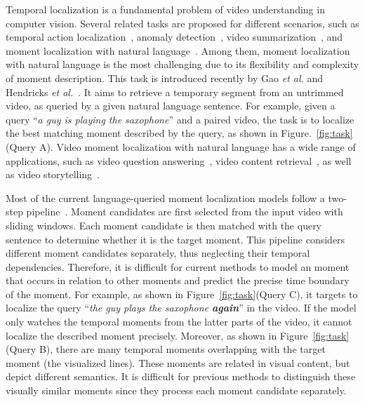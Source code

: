 \documentclass[letterpaper]{article} %
\begin{document}
Temporal localization is a fundamental problem of video understanding in computer vision.
Several related tasks are proposed for different scenarios, such as temporal action localization~\cite{SSN2017ICCV}, anomaly detection~\cite{hasan2016learning}, video summarization~\cite{song2015tvsum,chu2015video}, and moment localization with natural language~\cite{gao2017tall,hendricks17iccv}.
Among them, moment localization with natural language is the most challenging due to its flexibility and complexity of moment description.
This task is introduced recently by Gao \textit{et al.} and Hendricks \textit{et al.}~\cite{hendricks17iccv,gao2017tall}.
It aims to retrieve a temporary segment from an untrimmed video, as queried by a given natural language sentence.
For example, given a query ``\textit{a guy is playing the saxophone}'' and a paired video, the task is to localize the best matching moment described by the query, as shown in Figure.~\ref{fig:task}(Query A). Video moment localization with natural language has a wide range of applications, such as video question answering~\cite{lei2018tvqa}, video content retrieval~\cite{Shao_2018_ECCV}, as well as video storytelling~\cite{gella2018dataset}.


Most of the current language-queried moment localization models follow a two-step pipeline~\cite{gao2017tall,hendricks17iccv,Ge_2019_WACV,liu2018attentive,song2018val}.
Moment candidates are first selected from the input video with sliding windows. Each moment candidate is then matched with the query sentence to determine whether it is the target moment.
This pipeline considers different moment candidates separately, thus neglecting their temporal dependencies. Therefore, it is difficult for current methods to model an moment that occurs in relation to other moments and predict the precise time boundary of the moment. For example, as shown in Figure~\ref{fig:task}(Query C), it targets to localize the query ``\textit{the guy plays the saxophone \textbf{again}}'' in the video. If the model only watches the temporal moments from the latter parts of the video, it cannot localize the described moment precisely.
Moreover, as shown in Figure~\ref{fig:task}(Query B), there are many temporal moments overlapping with the target moment (the visualized lines).
These moments are related in visual content, but depict different semantics. It is difficult for previous methods to distinguish these visually similar moments since they process each moment candidate separately.
\end{document}
